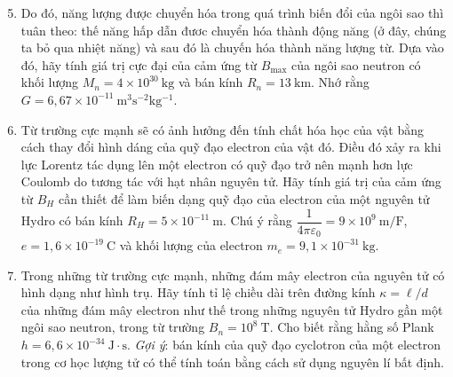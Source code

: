 \begin{vd}[Magnetars]
\begin{center}
    \end{center}
    \begin{enumerate}[1)]
    \setcounter{enumi}{4}
    \item Do đó, năng lượng được chuyển hóa trong quá trình biến đổi của ngôi sao thì tuân theo: thế năng hấp dẫn đươc chuyển hóa thành động năng (ở đây, chúng ta bỏ qua nhiệt năng) và sau đó là chuyến hóa thành năng lượng từ. Dựa vào đó, hãy tính giá trị cực đại của cảm ứng từ $B_{\max}$ của ngôi sao neutron có khối lượng $M_{n}=4\times10^{30}~\mathrm{kg}$ và bán kính $R_{n}=13~\mathrm{km}$. Nhớ rằng $G=6,67\times10^{-11}~\mathrm{m^3s^{-2}kg^{-1}}$.
    \item Từ trường cực mạnh sẽ có ảnh hưởng đến tính chất hóa học của vật bằng cách thay đổi hình dáng của quỹ đạo electron của vật đó. Điều đó xảy ra khi lực Lorentz tác dụng lên một electron có quỹ đạo trở nên mạnh hơn lực Coulomb do tương tác với hạt nhân nguyên tử. Hãy tính giá trị của cảm ứng từ $B_{H}$ cần thiết để làm biến dạng quỹ đạo của electron của một nguyên tử Hydro có bán kính $R_{H}=5\times10^{-11}~\mathrm{m}$. Chú ý rằng $\dfrac{1}{4\pi\varepsilon_0}=9\times10^9~\mathrm{m/F}$, $e=1,6\times10^{-19}~\mathrm{C}$ và khối lượng của electron $m_{e}=9,1\times10^{-31}~\mathrm{kg}$.
    \item Trong những từ trường cực mạnh, những đám mây electron của nguyên tử có hình dạng như hình trụ. Hãy tính tỉ lệ chiều dài trên đường kính $\kappa=\ell/d$ của những đám mây electron như thế trong những nguyên tử Hydro gần một ngôi sao neutron, trong từ trường $B_{n}=10^8~\mathrm{T}$. Cho biết rằng hằng số Plank $h=6,6\times10^{-34}~\mathrm{J\cdot s}$. \textit{Gợi ý}: bán kính của quỹ đạo cyclotron của một electron trong cơ học lượng tử có thể tính toán bằng cách sử dụng nguyên lí bất định.
\end{enumerate}
\end{vd}
